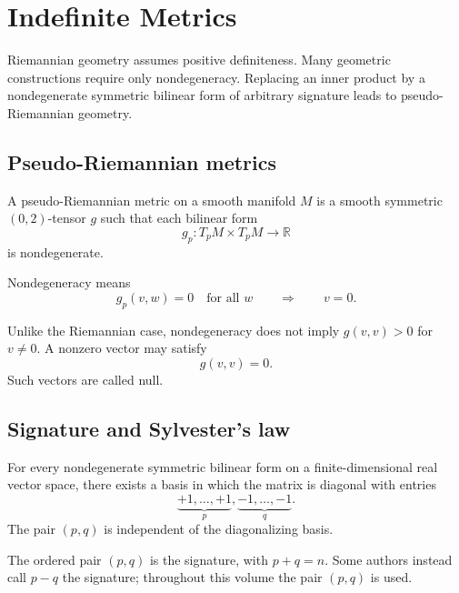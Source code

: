 \chapter{Indefinite Metrics}
\label{ch:vii29-indefinite-metrics}

Riemannian geometry assumes positive definiteness.  Many geometric constructions
require only nondegeneracy.  Replacing an inner product by a nondegenerate
symmetric bilinear form of arbitrary signature leads to pseudo-Riemannian
geometry.

\section{Pseudo-Riemannian metrics}

\begin{definition}\label{def:vii29-pseudo}
A pseudo-Riemannian metric on a smooth manifold \(M\) is a smooth symmetric
\((0,2)\)-tensor \(g\) such that each bilinear form
\[
g_p:T_pM\times T_pM\to\mathbb R
\]
is nondegenerate.
\end{definition}

Nondegeneracy means
\[
g_p(v,w)=0\quad\text{for all }w
\qquad\Longrightarrow\qquad
v=0.
\]

\begin{warning}\label{warn:vii29-null}
Unlike the Riemannian case, nondegeneracy does not imply \(g(v,v)>0\) for
\(v\ne0\).  A nonzero vector may satisfy
\[
g(v,v)=0.
\]
Such vectors are called null.
\end{warning}

\section{Signature and Sylvester's law}

\begin{theorem}\label{thm:vii29-sylvester}
For every nondegenerate symmetric bilinear form on a finite-dimensional real
vector space, there exists a basis in which the matrix is diagonal with entries
\[
\underbrace{+1,\dots,+1}_{p},
\underbrace{-1,\dots,-1}_{q}.
\]
The pair \((p,q)\) is independent of the diagonalizing basis.
\end{theorem}

\begin{definition}[Signature]\label{def:vii29-signature}
The ordered pair \((p,q)\) is the signature, with \(p+q=n\).
Some authors instead call \(p-q\) the signature; throughout this volume the pair
\((p,q)\) is used.
\end{definition}


